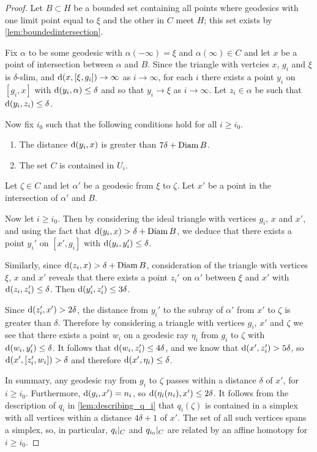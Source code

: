\documentclass[a4paper]{article}
\begin{document}
\begin{proof}
  Let $B\subset H$ be a bounded set containing all points where geodesics with
  one limit point equal to $\xi$ and the other in $C$ meet $H$; this set exists
  by \cref{lem:boundedintersection}.

  Fix $\alpha$ to be some geodesic with $\alpha(-\infty)=\xi$ and
  $\alpha(\infty)\in C$ and let $x$ be a point of intersection between $\alpha$
  and $B$. Since the triangle with vertcies $x$, $g_i$ and $\xi$ is
  $\delta$-slim, and $\operatorname{d}(x, [\xi, g_i]) \to \infty$ as $i\to\infty$, for
  each $i$ there exists a point $y_i$ on $[g_i, x]$ with $\operatorname{d}(y_i, \alpha)
  \leq \delta$ and so that $y_i \to \xi$ as $i\to\infty$. Let $z_i \in \alpha$
  be such that $\operatorname{d}(y_i, z_i)\leq\delta$.
  
  Now fix $i_0$ such that the following conditions hold for all $i\geq 
  i_0$.
  \begin{enumerate}
    \item The distance $\operatorname{d}(y_i,x)$ is greater than $7\delta + \operatorname{Diam} B$.
    \item The set $C$ is contained in $U_i$.
  \end{enumerate}

  Let $\zeta \in C$ and let $\alpha'$ be a geodesic from $\xi$ to $\zeta$. Let 
  $x'$ be a point in the intersection of $\alpha'$ and $B$. 

  Now let $i\geq i_0$. Then by considering the ideal triangle with vertices
  $g_i$, $x$ and $x'$, and using the fact that $\operatorname{d}(y_i, x) > \delta + \operatorname{Diam}
  B$, we deduce that there exists a point $y_i'$ on $[x', g_i]$ with
  $\operatorname{d}(y_i, y_i') \leq \delta$.

  Similarly, since $\operatorname{d}(z_i, x) > \delta + \operatorname{Diam} B$, consideration of the
  triangle with vertices $\xi$, $x$ and $x'$ reveals that there exists a point
  $z_i'$ on $\alpha'$ between $\xi$ and $x'$ with $\operatorname{d}(z_i, z_i') \leq
  \delta$. Then $\operatorname{d}(y_i', z_i') \leq 3\delta$.

  Since $\operatorname{d}(z_i', x') > 2\delta$, the distance from $y_i'$ to the subray of
  $\alpha'$ from $x'$ to $\zeta$ is greater than $\delta$. Therefore by
  considering a triangle with vertices $g_i$, $x'$ and $\zeta$ we see that
  there exists a point $w_i$ on a geodesic ray $\eta_i$ from $g_i$ to $\zeta$
  with $\operatorname{d}(w_i, y_i') \leq \delta$. It follows that $\operatorname{d}(w_i, z_i') \leq
  4\delta$, and we know that $\operatorname{d}(x', z_i') > 5\delta$, so $\operatorname{d}(x', [z_i',
  w_i]) > \delta$ and therefore $\operatorname{d}(x', \eta_i) \leq \delta$.

  In summary, any geodesic ray from $g_i$ to $\zeta$ passes within a distance 
  $\delta$ of $x'$, for $i\geq i_0$. Furthermore, $\operatorname{d}(g_i,x') = n_i$, so 
  $\operatorname{d}(\eta_i(n_i), x')\leq 2\delta$. It follows from the description of
  $q_i$ in \cref{lem:describing_q_i} that $q_i(\zeta)$ is contained in a
  simplex with all vertices within a distance $4\delta+1$ of $x'$. The set of
  all such vertices spans a simplex, so, in particular, $q_i\vert_{C}$ and
  $q_{i_0}\vert_{C}$ are related by an affine homotopy for $i \geq i_0$. 
\end{proof}
\end{document}

